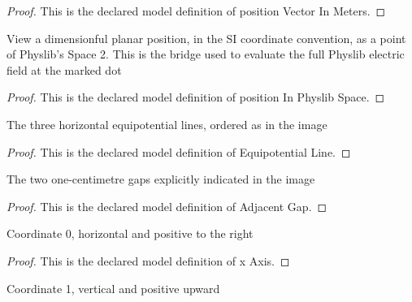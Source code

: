 \begin{proof}
  This is the declared model definition of position Vector In Meters.
\end{proof}
\begin{definition}
  \label{def:physics:phyx-mini-0870:phyxminiproblems-problemphyxmini0870-positioninphyslibspace}
  View a dimensionful planar position, in the SI coordinate convention, as a point of Physlib's Space 2. This is the bridge used to evaluate the full Physlib electric field at the marked dot
\end{definition}
\begin{proof}
  This is the declared model definition of position In Physlib Space.
\end{proof}
\begin{definition}
  \label{def:physics:phyx-mini-0870:phyxminiproblems-problemphyxmini0870-equipotentialline}
  The three horizontal equipotential lines, ordered as in the image
\end{definition}
\begin{proof}
  This is the declared model definition of Equipotential Line.
\end{proof}
\begin{definition}
  \label{def:physics:phyx-mini-0870:phyxminiproblems-problemphyxmini0870-adjacentgap}
  The two one-centimetre gaps explicitly indicated in the image
\end{definition}
\begin{proof}
  This is the declared model definition of Adjacent Gap.
\end{proof}
\begin{definition}[x Axis]
  \label{def:physics:phyx-mini-0870:phyxminiproblems-problemphyxmini0870-xaxis}
  Coordinate 0, horizontal and positive to the right
\end{definition}
\begin{proof}
  This is the declared model definition of x Axis.
\end{proof}
\begin{definition}[y Axis]
  \label{def:physics:phyx-mini-0870:phyxminiproblems-problemphyxmini0870-yaxis}
  Coordinate 1, vertical and positive upward
\end{definition}

